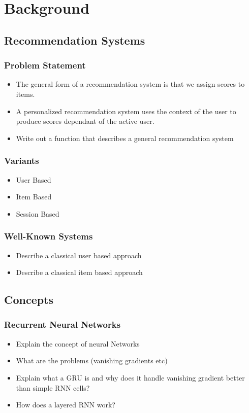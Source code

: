 \chapter{Background}

\section{Recommendation Systems}
\subsection{Problem Statement}
\begin{itemize}
    \item The general form of a recommendation system is that we assign scores to items.
    \item A personalized recommendation system uses the context of the user to produce scores dependant of the active user.
    \item Write out a function that describes a general recommendation system
\end{itemize}
\subsection{Variants}
\begin{itemize}
    \item User Based
    \item Item Based
    \item Session Based
\end{itemize}
\subsection{Well-Known Systems}
\begin{itemize}
    \item Describe a classical user based approach
    \item Describe a classical item based approach
\end{itemize}

\section{Concepts}
\subsection{Recurrent Neural Networks}
\begin{itemize}
    \item Explain the concept of neural Networks
    \item What are the problems (vanishing gradients etc)
    \item Explain what a GRU is and why does it handle vanishing gradient better than simple RNN cells?
    \item How does a layered RNN work?
\end{itemize}
